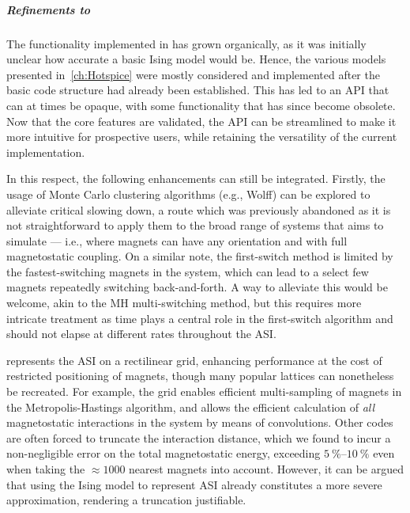 \subparagraph{Refinements to \hotspice}
The functionality implemented in \hotspice has grown organically, as it was initially unclear how accurate a basic Ising model would be.
Hence, the various models presented in~\cref{ch:Hotspice} were mostly considered and implemented after the basic code structure had already been established.
This has led to an API that can at times be opaque, with some functionality that has since become obsolete.
Now that the core features are validated, the API can be streamlined to make it more intuitive for prospective users, while retaining the versatility of the current implementation. \par
In this respect, the following enhancements can still be integrated.
Firstly, the usage of Monte Carlo clustering algorithms (e.g., Wolff) can be explored to alleviate critical slowing down, a route which was previously abandoned as it is not straightforward to apply them to the broad range of systems that \hotspice aims to simulate --- i.e., where magnets can have any orientation and with full magnetostatic coupling.
On a similar note, the first-switch method is limited by the fastest-switching magnets in the system, which can lead to a select few magnets repeatedly switching back-and-forth.
A way to alleviate this would be welcome, akin to the MH multi-switching method, but this requires more intricate treatment as time plays a central role in the first-switch algorithm and should not elapse at different rates throughout the ASI. \\\par

\hotspice represents the ASI on a rectilinear grid, enhancing performance at the cost of restricted positioning of magnets, though many popular lattices can nonetheless be recreated.
For example, the grid enables efficient multi-sampling of magnets in the Metropolis-Hastings algorithm, and allows the efficient calculation of \textit{all} magnetostatic interactions in the system by means of convolutions.
Other codes are often forced to truncate the interaction distance, which we found to incur a non-negligible error on the total magnetostatic energy, exceeding $\SIrange{5}{10}{\percent}$ even when taking the $\approx 1000$ nearest magnets into account.
However, it can be argued that using the Ising model to represent ASI already constitutes a more severe approximation, rendering a truncation justifiable. \\\par

